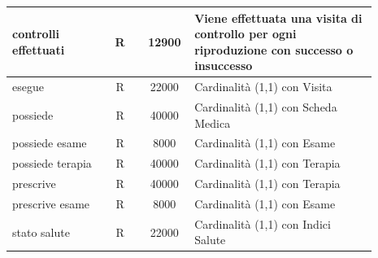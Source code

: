 \documentclass[12pt,a4paper]{article}
\begin{document}
\begin{center}
\begin{longtable}{|p{0.23\linewidth}|p{0.1\linewidth}|p{0.11\linewidth}|p{0.45\linewidth}|}
\hline
controlli effettuati
 & 
\multicolumn{1}{|c|}{R}
 & 
\multicolumn{1}{|c|}{12900}
 & 
Viene effettuata una visita di controllo per ogni riproduzione con successo o insuccesso  
\\

\hline
esegue
 & 
\multicolumn{1}{|c|}{R}
 & 
\multicolumn{1}{|c|}{22000}
 & 
Cardinalità (1,1) con Visita
\\

\hline
possiede
 & 
\multicolumn{1}{|c|}{R}
 & 
\multicolumn{1}{|c|}{40000}
 & 
Cardinalità (1,1) con Scheda Medica
\\

\hline
possiede esame
 & 
\multicolumn{1}{|c|}{R}
 & 
\multicolumn{1}{|c|}{8000}
 & 
Cardinalità (1,1) con Esame
\\

\hline
possiede terapia
 & 
\multicolumn{1}{|c|}{R}
 & 
\multicolumn{1}{|c|}{40000}
 & 
Cardinalità (1,1) con Terapia
\\

\hline
prescrive
 & 
\multicolumn{1}{|c|}{R}
 & 
\multicolumn{1}{|c|}{40000}
 & 
Cardinalità (1,1) con Terapia
\\

\hline
prescrive esame
 & 
\multicolumn{1}{|c|}{R}
 & 
\multicolumn{1}{|c|}{8000}
 & 
Cardinalità (1,1) con Esame
\\

\hline
stato salute
 & 
\multicolumn{1}{|c|}{R}
 & 
\multicolumn{1}{|c|}{22000}
 & 
Cardinalità (1,1) con Indici Salute
\\

\hline

\end{longtable}\end{center}
\end{document}
